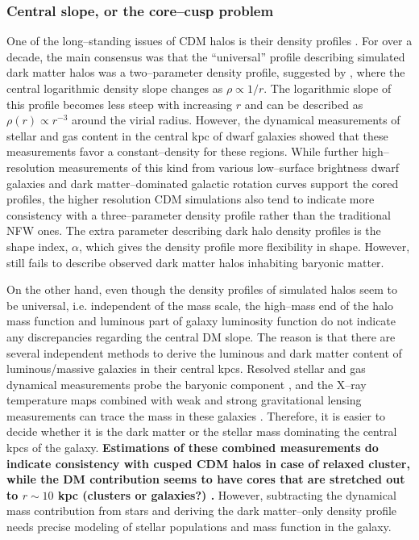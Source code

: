 \documentclass[paper=a4, fontsize=11pt]{scrartcl} %
\numberwithin{equation}{section} %
\numberwithin{figure}{section} %
\numberwithin{table}{section} %
\begin{document}
\subsubsection{Central slope, or the core--cusp problem}
\label{subsec:core-cusp}
One of the long--standing issues of CDM halos is their density profiles \citep[][]{Dubinski.Carlberg1991, Walker.Penarrubia2011}. For over a decade, the main consensus was that the ``universal'' profile describing simulated dark matter halos was a two--parameter density profile, suggested by \citet[][ hereafter NFW]{NFW}, where the central logarithmic density slope changes as $\rho \propto 1/r$. The logarithmic slope of this profile becomes less steep with increasing $r$ and can be described as $\rho(r) \propto r^{-3}$ around the virial radius. However, the dynamical measurements of stellar and gas content in the central kpc of dwarf galaxies \citep[][]{} showed that these measurements favor a constant--density for these regions. While further high--resolution measurements of this kind from various low--surface brightness dwarf galaxies and dark matter--dominated galactic rotation curves support the cored profiles, the higher resolution CDM simulations also tend to indicate more consistency with a three--parameter density profile rather than the traditional NFW ones. The extra parameter describing dark halo density profiles is the shape index, $\alpha$, which gives the density profile more flexibility in shape. However, still fails to describe observed dark matter halos inhabiting baryonic matter. 

On the other hand, even though the density profiles of simulated halos seem to be universal, i.e. independent of the mass scale, the high--mass end of the halo mass function and luminous part of galaxy luminosity function do not indicate any discrepancies regarding the central DM slope. The reason is that there are several independent methods to derive the luminous and dark matter content of luminous/massive galaxies in their central kpcs. Resolved stellar and gas dynamical measurements probe the baryonic component \citep[][]{}, and the X--ray temperature maps combined with weak and strong gravitational lensing measurements can trace the mass in these galaxies \citep[][]{}. Therefore, it is easier to decide whether it is the dark matter or the stellar mass dominating the central kpcs of the galaxy. {\bf Estimations of these combined measurements do indicate consistency with cusped CDM halos in case of relaxed cluster, while the DM contribution seems to have cores that are stretched out to $r\sim 10$ kpc (clusters or galaxies?) \citep[][]{}.} However, subtracting the dynamical mass contribution from stars and deriving the dark matter--only density profile needs precise modeling of stellar populations and mass function in the galaxy. 
\end{document}
